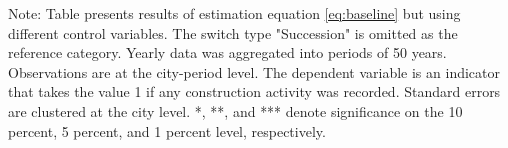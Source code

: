 \begin{table}[htbp]
\begin{tabular}{lcccc}
      
   \end{tabular}
   
   \par \raggedright 
   Note: Table presents results of estimation equation \eqref{eq:baseline} but using different control variables. The switch type  "Succession" is omitted as the reference category. Yearly data was aggregated into periods of 50 years. Observations are at the city-period level. The dependent variable is an  indicator that takes the value 1 if any construction activity was recorded.  Standard errors are clustered at the city level. *, **, and *** denote significance on the 10 percent, 5 percent, and 1 percent  level, respectively.
\end{table}
